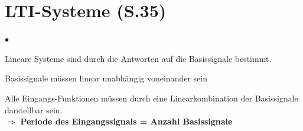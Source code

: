 \section{LTI-Systeme (S.35)}
\begin{list}{$\bullet$}{\setlength{\itemsep}{0cm} \setlength{\parsep}{0cm} \setlength{\topsep}{0cm}} 
	\item Lineare Systeme sind durch die Antworten auf die
	Basissignale bestimmt.
	\item Basissignale müssen linear unabhängig voneinander sein
	\item Alle Eingangs-Funktionen müssen durch eine Linearkombination der
	Basissignale darstellbar sein.\\ $\Rightarrow$ \textbf{Periode des Eingangssignals =	Anzahl Basissignale}
\end{list}

\begingroup
\small
\renewcommand{\arraystretch}{1.3}
\providecommand{\ltikey}[1]{\fcolorbox{red!70!black}{white}{$#1$}}

